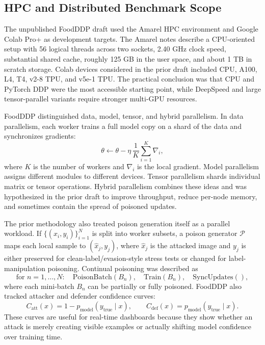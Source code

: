 ﻿\documentclass[6p,10pt,times]{ieeeaccess}
\begin{document}
\subsection{HPC and Distributed Benchmark Scope}

The unpublished FoodDDP draft used the Amarel HPC environment and Google Colab Pro+ as development targets. The Amarel notes describe a CPU-oriented setup with 56 logical threads across two sockets, 2.40 GHz clock speed, substantial shared cache, roughly 125 GB in the user space, and about 1 TB in scratch storage. Colab devices considered in the prior draft included CPU, A100, L4, T4, v2-8 TPU, and v5e-1 TPU. The practical conclusion was that CPU and PyTorch DDP were the most accessible starting point, while DeepSpeed and large tensor-parallel variants require stronger multi-GPU resources.

FoodDDP distinguished data, model, tensor, and hybrid parallelism. In data parallelism, each worker trains a full model copy on a shard of the data and synchronizes gradients:
\begin{equation}
\theta \leftarrow \theta-\eta\,\frac{1}{K}\sum_{i=1}^{K}\nabla_i ,
\end{equation}
where \(K\) is the number of workers and \(\nabla_i\) is the local gradient. Model parallelism assigns different modules to different devices. Tensor parallelism shards individual matrix or tensor operations. Hybrid parallelism combines these ideas and was hypothesized in the prior draft to improve throughput, reduce per-node memory, and sometimes contain the spread of poisoned updates.

The prior methodology also treated poison generation itself as a parallel workload. If \(\{(x_i,y_i)\}_{i=1}^{N}\) is split into worker subsets, a poison generator \(\mathcal{P}\) maps each local sample to \((\hat{x}_j,y_j)\), where \(\hat{x}_j\) is the attacked image and \(y_j\) is either preserved for clean-label/evasion-style stress tests or changed for label-manipulation poisoning. Continual poisoning was described as
\[
\text{for } n=1,\ldots,N:\quad \text{PoisonBatch}(B_n),\quad \text{Train}(B_n),\quad \text{SyncUpdates}(),
\]
where each mini-batch \(B_n\) can be partially or fully poisoned. FoodDDP also tracked attacker and defender confidence curves:
\[
C_{\mathrm{att}}(x)=1-p_{\mathrm{model}}(y_{\mathrm{true}}\mid x),\qquad
C_{\mathrm{def}}(x)=p_{\mathrm{model}}(y_{\mathrm{true}}\mid x).
\]
These curves are useful for real-time dashboards because they show whether an attack is merely creating visible examples or actually shifting model confidence over training time.
\end{document}
